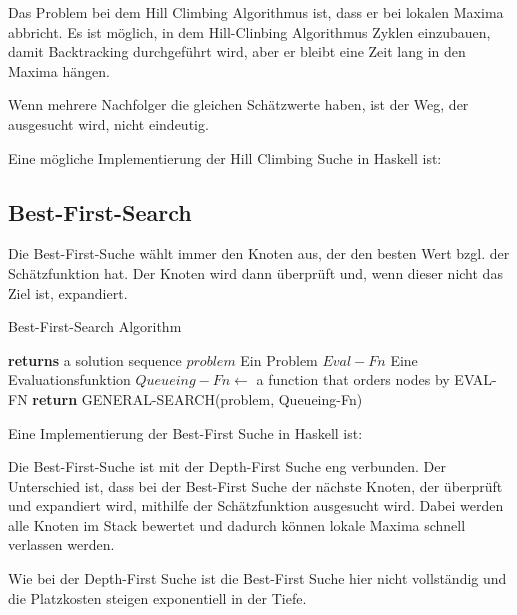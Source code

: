 Das Problem bei dem Hill Climbing Algorithmus ist, dass er bei lokalen Maxima abbricht. Es ist möglich, in dem Hill-Clinbing Algorithmus Zyklen einzubauen, damit Backtracking durchgeführt wird, aber er bleibt eine Zeit lang in den Maxima hängen.

Wenn mehrere Nachfolger die gleichen Schätzwerte haben, ist der Weg, der ausgesucht wird, nicht eindeutig.

Eine mögliche Implementierung der Hill Climbing Suche in Haskell ist:



\subsection{Best-First-Search}
Die Best-First-Suche wählt immer den Knoten aus, der den besten Wert bzgl. der Schätzfunktion hat. Der Knoten wird dann überprüft und, wenn dieser nicht das Ziel ist, expandiert.


\begin{algorithm}
\caption{Best-First-Search Algorithm}
\begin{algorithmic}[1]
 \State \textbf{returns} a solution sequence
\INPUT
\Statex $problem$ \Comment Ein Problem
\Statex $Eval-Fn$  \Comment Eine Evaluationsfunktion
\State $Queueing-Fn \gets$ a function that orders nodes by EVAL-FN
\State \textbf{return} GENERAL-SEARCH(problem, Queueing-Fn)
\EndFunction
\end{algorithmic}
\end{algorithm}


Eine Implementierung der Best-First Suche in Haskell ist:



Die Best-First-Suche ist mit der Depth-First Suche eng verbunden. Der Unterschied ist, dass bei der Best-First Suche der nächste Knoten, der überprüft und expandiert wird, mithilfe der Schätzfunktion ausgesucht wird. Dabei werden alle Knoten im Stack bewertet und dadurch können lokale Maxima schnell verlassen werden.

Wie bei der Depth-First Suche ist die Best-First Suche hier nicht vollständig und die Platzkosten steigen exponentiell in der Tiefe.

